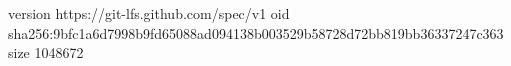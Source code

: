 version https://git-lfs.github.com/spec/v1
oid sha256:9bfc1a6d7998b9fd65088ad094138b003529b58728d72bb819bb36337247c363
size 1048672
